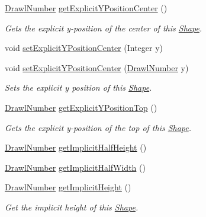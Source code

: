 \begin{DoxyCompactItemize}
\hyperlink{classcom_1_1aarrelaakso_1_1drawl_1_1_drawl_number}{Drawl\+Number} \hyperlink{classcom_1_1aarrelaakso_1_1drawl_1_1_shape_a602cb73f783f2856fa81e82bf7792263}{get\+Explicit\+Y\+Position\+Center} ()
\begin{DoxyCompactList}\small\item\em Gets the explicit y-\/position of the center of this \hyperlink{classcom_1_1aarrelaakso_1_1drawl_1_1_shape}{Shape}. \end{DoxyCompactList}\item 
void \hyperlink{classcom_1_1aarrelaakso_1_1drawl_1_1_shape_a947c00be2ea3d0e732814b8ca377df45}{set\+Explicit\+Y\+Position\+Center} (Integer y)
\item 
void \hyperlink{classcom_1_1aarrelaakso_1_1drawl_1_1_shape_a169bdd3220baa80ebb083b3b2db12546}{set\+Explicit\+Y\+Position\+Center} (\hyperlink{classcom_1_1aarrelaakso_1_1drawl_1_1_drawl_number}{Drawl\+Number} y)
\begin{DoxyCompactList}\small\item\em Sets the explicit y position of this \hyperlink{classcom_1_1aarrelaakso_1_1drawl_1_1_shape}{Shape}. \end{DoxyCompactList}\item 
\hyperlink{classcom_1_1aarrelaakso_1_1drawl_1_1_drawl_number}{Drawl\+Number} \hyperlink{classcom_1_1aarrelaakso_1_1drawl_1_1_shape_a95f8a2f107299d91813627a95b3e0f0f}{get\+Explicit\+Y\+Position\+Top} ()
\begin{DoxyCompactList}\small\item\em Gets the explicit y-\/position of the top of this \hyperlink{classcom_1_1aarrelaakso_1_1drawl_1_1_shape}{Shape}. \end{DoxyCompactList}\item 
\hyperlink{classcom_1_1aarrelaakso_1_1drawl_1_1_drawl_number}{Drawl\+Number} \hyperlink{classcom_1_1aarrelaakso_1_1drawl_1_1_shape_aa476150489a3a5b634a15a1c03e045d7}{get\+Implicit\+Half\+Height} ()
\item 
\hyperlink{classcom_1_1aarrelaakso_1_1drawl_1_1_drawl_number}{Drawl\+Number} \hyperlink{classcom_1_1aarrelaakso_1_1drawl_1_1_shape_ac796f934debb4cf92d285f387422deb6}{get\+Implicit\+Half\+Width} ()
\item 
\hyperlink{classcom_1_1aarrelaakso_1_1drawl_1_1_drawl_number}{Drawl\+Number} \hyperlink{classcom_1_1aarrelaakso_1_1drawl_1_1_shape_a41cc097acddea53404b62a812ef37276}{get\+Implicit\+Height} ()
\begin{DoxyCompactList}\small\item\em Get the implicit height of this \hyperlink{classcom_1_1aarrelaakso_1_1drawl_1_1_shape}{Shape}. \end{DoxyCompactList}\item 

\end{DoxyCompactItemize}
